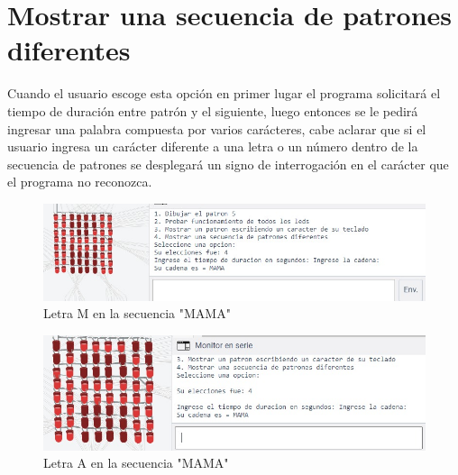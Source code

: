 \documentclass{article}
\begin{document}
\section{Mostrar una secuencia de patrones diferentes}\label{op4}
Cuando el usuario escoge esta opción en primer lugar el programa solicitará el tiempo de duración entre patrón y el siguiente, luego entonces se le pedirá ingresar una palabra compuesta por varios carácteres, cabe aclarar que si el usuario ingresa un carácter diferente a una letra o un número dentro de la secuencia de patrones se desplegará un signo de interrogación en el carácter que el programa no reconozca.

    \begin{figure}[h]
    \includegraphics[width=13cm]{Ma.jpeg}
    \centering
    \caption{Letra M en la secuencia "MAMA" }
    \label{ma}
    \end{figure}

    \begin{figure}[h]
    \includegraphics[width=13cm]{A.jpeg}
    \centering
    \caption{Letra A en la secuencia "MAMA" }
    \label{a}
    \end{figure}
    

\end{document}
